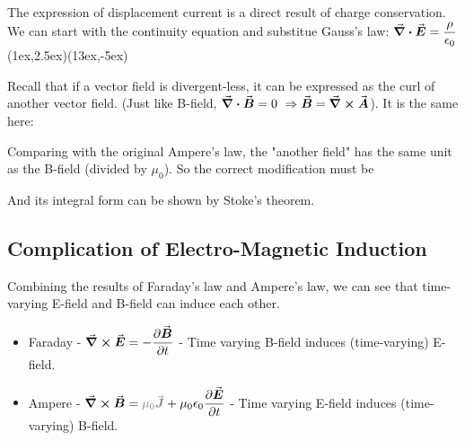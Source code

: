 \documentclass[class=article, crop=false, 12pt]{standalone}
\begin{document}
\begin{notation}[Derivation:]

    The expression of displacement current is a direct result of charge conservation.
    We can start with the continuity equation and substitue Gauss's law:
    {$\div \va*{E} = \dfrac{\rho}{\epsilon_0}$}{(1ex,2.5ex)}{(13ex,-5ex)}

    Recall that if a vector field is divergent-less,
    it can be expressed as the curl of another vector field.
    (Just like B-field, $\div \va*{B}=0 \ \Rightarrow \va*{B} = \curl \va*{A}$).
    It is the same here:

    Comparing with the original Ampere's law,
    the "another field" has the same unit as the B-field (divided by $\mu_0$).
    So the correct modification must be 

    And its integral form can be shown by Stoke's theorem.

\end{notation}



\subsection{Complication of Electro-Magnetic Induction}

Combining the results of Faraday's law and Ampere's law,
we can see that time-varying E-field and B-field can induce each other.
\begin{itemize}
    \item Faraday - $\curl \vvec{E} = -\pdvv{\vvec{B}}{t}$ - 
    Time varying B-field induces (time-varying) E-field.

    \item Ampere - $\curl \vvec{B} = \gray{\mu_0\vvec{J}} + \mu_0\epsilon_0\pdvv{\vvec{E}}{t}$ -
    Time varying E-field induces (time-varying) B-field.
\end{itemize}
\end{document}
